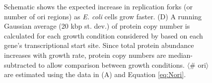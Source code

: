 \begin{figure}
\begin{fullwidth}
{{        Schematic shows the expected increase in replication forks (or number of
        ori regions) as \textit{E. coli} cells grow faster. (D) A running
        Gaussian average (20 kbp st. dev.) of protein copy number is calculated
        for each growth condition considered by \citep{schmidt2016} based
        on each gene's transcriptional start site. Since total
        protein abundance increases with growth rate, protein copy numbers are
        median-subtracted to allow comparison between growth conditions.
        $\langle$\# ori$\rangle$ are estimated using the data in (A) and
        Equation \ref{eq:Nori}. } \label{fig:translation_ecoli_partA}
    }
    \end{fullwidth}
\end{figure}
